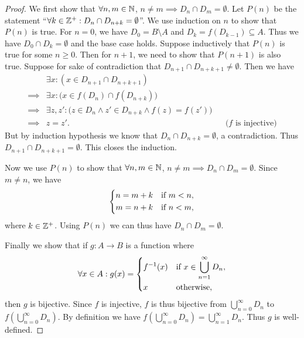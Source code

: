 \begin{proof}
  We first show that \(\forall n, m \in \mathbb{N}\), \(n \neq m \implies D_n \cap D_m = \emptyset\).
  Let \(P(n)\) be the statement ``\(\forall k \in \mathbb{Z}^+ : D_n \cap D_{n + k} = \emptyset\)''.
  We use induction on \(n\) to show that \(P(n)\) is true.
  For \(n = 0\), we have \(D_0 = B \setminus A\) and \(D_k = f(D_{k - 1}) \subseteq A\).
  Thus we have \(D_0 \cap D_k = \emptyset\) and the base case holds.
  Suppose inductively that \(P(n)\) is true for some \(n \geq 0\).
  Then for \(n + 1\), we need to show that \(P(n + 1)\) is also true.
  Suppose for sake of contradiction that \(D_{n + 1} \cap D_{n + k + 1} \neq \emptyset\).
  Then we have
  \begin{align*}
             & \exists x : (x \in D_{n + 1} \cap D_{n + k + 1})                                                               \\
    \implies & \exists x : \big(x \in f(D_n) \cap f(D_{n + k})\big)                                                           \\
    \implies & \exists z, z' : \big(z \in D_n \land z' \in D_{n + k} \land f(z) = f(z')\big)                                  \\
    \implies & z = z'.                                                                       &  & \text{(\(f\) is injective)}
  \end{align*}
  But by induction hypothesis we know that \(D_n \cap D_{n + k} = \emptyset\), a contradiction.
  Thus \(D_{n + 1} \cap D_{n + k + 1} = \emptyset\).
  This closes the induction.

  Now we use \(P(n)\) to show that \(\forall n, m \in \mathbb{N}\), \(n \neq m \implies D_n \cap D_m = \emptyset\).
  Since \(m \neq n\), we have
  \[
    \begin{dcases}
      n = m + k & \text{if } m < n, \\
      m = n + k & \text{if } n < m,
    \end{dcases}
  \]
  where \(k \in \mathbb{Z}^+\).
  Using \(P(n)\) we can thus have \(D_n \cap D_m = \emptyset\).

  Finally we show that if \(g : A \to B\) is a function where
  \[
    \forall x \in A : g(x) = \begin{dcases}
      f^{-1}(x) & \text{if } x \in \bigcup_{n = 1}^\infty D_n, \\
      x         & \text{otherwise},
    \end{dcases}
  \]
  then \(g\) is bijective.
  Since \(f\) is injective, \(f\) is thus bijective from \(\bigcup_{n = 0}^\infty D_n\) to \(f(\bigcup_{n = 0}^\infty D_n)\).
  By definition we have \(f(\bigcup_{n = 0}^\infty D_n) = \bigcup_{n = 1}^\infty D_n\).
  Thus \(g\) is well-defined.


\end{proof}
